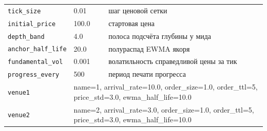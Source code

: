\documentclass[11pt,a4paper]{article}
\newcommand{\code}[1]{\texttt{\small #1}}
\begin{document}
\begin{longtable}{p{}p{}p{}}
\code{tick\_size} & 0.01 & шаг ценовой сетки \\
\code{initial\_price} & 100.0 & стартовая цена \\
\code{depth\_band} & 4.0 & полоса подсчёта глубины у мида \\
\code{anchor\_half\_life} & 20.0 & полураспад EWMA якоря \\
\code{fundamental\_vol} & 0.001 & волатильность справедливой цены за тик \\
\code{progress\_every} & 500 & период печати прогресса \\
\code{venue1} & \multicolumn{2}{p{0.62\textwidth}}{name=1, arrival\_rate=10.0, order\_size=1.0, order\_ttl=5, price\_std=3.0, ewma\_half\_life=10.0} \\
\code{venue2} & \multicolumn{2}{p{0.62\textwidth}}{name=2, arrival\_rate=3.0, order\_size=1.0, order\_ttl=5, price\_std=3.0, ewma\_half\_life=10.0} \\
\bottomrule
\end{longtable}
\end{document}
